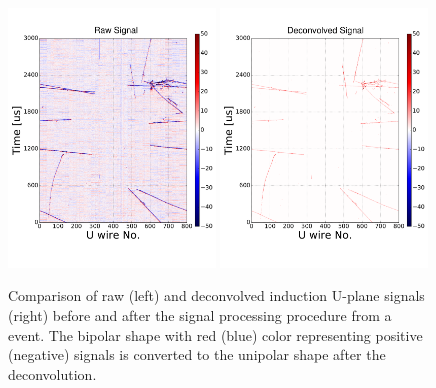 \begin{figure}[ht]
\centering
\includegraphics[width=0.49\textwidth]{graphics/IntroFigures/Fig_05a_protodune_raw_u.pdf}
\includegraphics[width=0.49\textwidth]{graphics/IntroFigures/Fig_05b_protodune_decon_u.pdf}
\caption{Comparison of raw (left) and deconvolved induction U-plane signals (right) before and after 
the signal processing procedure from a  event. The bipolar shape with red (blue) color representing
positive (negative) signals is converted to the unipolar shape after the \twod deconvolution.}
\label{deconvolution}
\end{figure}

